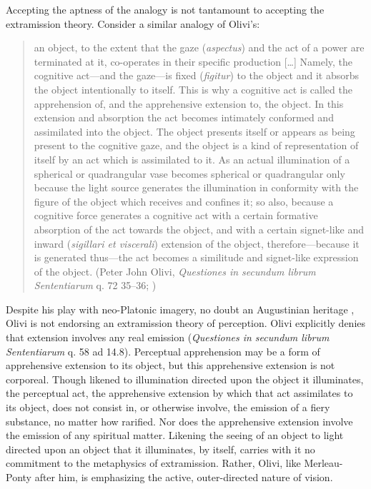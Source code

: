 Accepting the aptness of the analogy is not tantamount to accepting the extramission theory. Consider a similar analogy of Olivi's:
\begin{quote}
	an object, to the extent that the gaze (\emph{aspectus}) and the act of a power are terminated at it, co-operates in their specific production [\ldots] Namely, the cognitive act---and the gaze---is fixed (\emph{figitur}) to the object and it absorbs the object intentionally to itself. This is why a cognitive act is called the apprehension of, and the apprehensive extension to, the object. In this extension and absorption the act becomes intimately conformed and assimilated into the object. The object presents itself or appears as being present to the cognitive gaze, and the object is a kind of representation of itself by an act which is assimilated to it. As an actual illumination of a spherical or quadrangular vase becomes spherical or quadrangular only because the light source generates the illumination in conformity with the figure of the object which receives and confines it; so also, because a cognitive force generates a cognitive act with a certain formative absorption of the act towards the object, and with a certain signet-like and inward (\emph{sigillari et viscerali}) extension of the object, therefore---because it is generated thus---the act becomes a similitude and signet-like expression of the object. (Peter John Olivi, \emph{Questiones in secundum librum Sententiarum} q. 72 35--36; \citealt[146--147]{Toivanen:2013ul})
\end{quote}
Despite his play with neo-Platonic imagery, no doubt an Augustinian heritage \citep[198]{Kent:1984zm}, Olivi is not endorsing an extramission theory of perception. Olivi explicitly denies that extension involves any real emission (\emph{Questiones in secundum librum Sententiarum} q. 58 ad 14.8). Perceptual apprehension may be a form of apprehensive extension to its object, but this apprehensive extension is not corporeal. Though likened to illumination directed upon the object it illuminates, the perceptual act, the apprehensive extension by which that act assimilates to its object, does not consist in, or otherwise involve, the emission of a fiery substance, no matter how rarified. Nor does the apprehensive extension involve the emission of any spiritual matter. Likening the seeing of an object to light directed upon an object that it illuminates, by itself, carries with it no commitment to the metaphysics of extramission. Rather, Olivi, like Merleau-Ponty after him, is emphasizing the active, outer-directed nature of vision.

